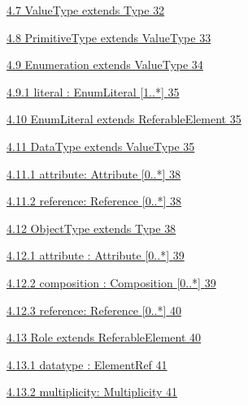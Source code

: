 \documentclass[10pt,a4paper]{ivoa}
\begin{document}
\protect\hyperlink{valuetype-extends-type}{4.7 ValueType extends Type
\protect\hyperlink{valuetype-extends-type}{32}}

\protect\hyperlink{primitivetype-extends-valuetype}{4.8 PrimitiveType
extends ValueType
\protect\hyperlink{primitivetype-extends-valuetype}{33}}

\protect\hyperlink{enumeration-extends-valuetype}{4.9 Enumeration
extends ValueType \protect\hyperlink{enumeration-extends-valuetype}{34}}

\protect\hyperlink{literal-enumliteral-1..}{4.9.1 literal : EnumLiteral
{[}1..*{]} \protect\hyperlink{literal-enumliteral-1..}{35}}

\protect\hyperlink{enumliteral-extends-referableelement}{4.10
EnumLiteral extends ReferableElement
\protect\hyperlink{enumliteral-extends-referableelement}{35}}

\protect\hyperlink{datatype-extends-valuetype}{4.11 DataType extends
ValueType \protect\hyperlink{datatype-extends-valuetype}{35}}

\protect\hyperlink{attribute-attribute-0..}{4.11.1 attribute: Attribute
{[}0..*{]} \protect\hyperlink{attribute-attribute-0..}{38}}

\protect\hyperlink{reference-reference-0..}{4.11.2 reference: Reference
{[}0..*{]} \protect\hyperlink{reference-reference-0..}{38}}

\protect\hyperlink{objecttype-extends-type}{4.12 ObjectType extends Type
\protect\hyperlink{objecttype-extends-type}{38}}

\protect\hyperlink{attribute-attribute-0..-1}{4.12.1 attribute :
Attribute {[}0..*{]} \protect\hyperlink{attribute-attribute-0..-1}{39}}

\protect\hyperlink{composition-composition-0..}{4.12.2 composition :
Composition {[}0..*{]}
\protect\hyperlink{composition-composition-0..}{39}}

\protect\hyperlink{reference-reference-0..-1}{4.12.3 reference:
Reference {[}0..*{]} \protect\hyperlink{reference-reference-0..-1}{40}}

\protect\hyperlink{role-extends-referableelement}{4.13 Role extends
ReferableElement \protect\hyperlink{role-extends-referableelement}{40}}

\protect\hyperlink{datatype-elementref}{4.13.1 datatype : ElementRef
\protect\hyperlink{datatype-elementref}{41}}

\protect\hyperlink{multiplicity-multiplicity}{4.13.2 multiplicity:
Multiplicity \protect\hyperlink{multiplicity-multiplicity}{41}}
\end{document}
